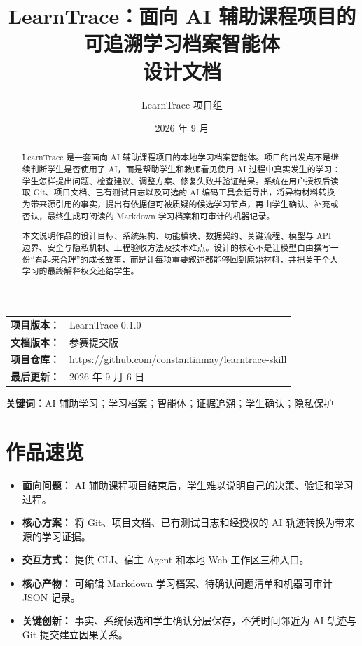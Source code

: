 \documentclass[UTF8,a4paper,12pt]{ctexart}
\title{\vspace{-1.4cm}\textbf{LearnTrace：面向 AI 辅助课程项目的\\可追溯学习档案智能体}\\[0.7em]
\large 设计文档}
\author{LearnTrace 项目组}
\date{2026 年 9 月}
\begin{document}
\maketitle
\thispagestyle{fancy}

\begin{center}
\small
\begin{tabular}{rl}
\textbf{项目版本：} & LearnTrace 0.1.0 \\
\textbf{文档版本：} & 参赛提交版 \\
\textbf{项目仓库：} & \url{https://github.com/constantinmay/learntrace-skill} \\
\textbf{最后更新：} & 2026 年 9 月 6 日
\end{tabular}
\end{center}

\begin{abstract}
LearnTrace 是一套面向 AI 辅助课程项目的本地学习档案智能体。项目的出发点不是继续判断学生是否使用了 AI，而是帮助学生和教师看见使用 AI 过程中真实发生的学习：学生怎样提出问题、检查建议、调整方案、修复失败并验证结果。系统在用户授权后读取 Git、项目文档、已有测试日志以及可选的 AI 编码工具会话导出，将异构材料转换为带来源引用的事实，提出有依据但可被质疑的候选学习节点，再由学生确认、补充或否认，最终生成可阅读的 Markdown 学习档案和可审计的机器记录。

本文说明作品的设计目标、系统架构、功能模块、数据契约、关键流程、模型与 API 边界、安全与隐私机制、工程验收方法及技术难点。设计的核心不是让模型自由撰写一份“看起来合理”的成长故事，而是让每项重要叙述都能够回到原始材料，并把关于个人学习的最终解释权交还给学生。
\end{abstract}

\noindent\textbf{关键词：}AI 辅助学习；学习档案；智能体；证据追溯；学生确认；隐私保护

\clearpage
\tableofcontents
\clearpage

\section*{作品速览}

\begin{itemize}
  \item \textbf{面向问题：} AI 辅助课程项目结束后，学生难以说明自己的决策、验证和学习过程。
  \item \textbf{核心方案：} 将 Git、项目文档、已有测试日志和经授权的 AI 轨迹转换为带来源的学习证据。
  \item \textbf{交互方式：} 提供 CLI、宿主 Agent 和本地 Web 工作区三种入口。
  \item \textbf{核心产物：} 可编辑 Markdown 学习档案、待确认问题清单和机器可审计 JSON 记录。
  \item \textbf{关键创新：} 事实、系统候选和学生确认分层保存，不凭时间邻近为 AI 轨迹与 Git 提交建立因果关系。
\end{itemize}
\end{document}
